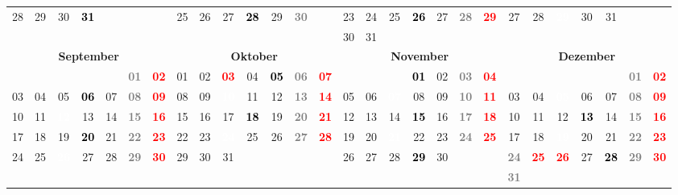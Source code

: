 \documentclass[10pt,a4paper,landscape]{article}
\newcommand{\yb}[1]{\cellcolor{yellow}\textcolor{black}{\bf #1}}
\newcommand{\iv}[1]{\cellcolor{black}\textcolor{white}{\bf #1}}
\newcommand{\rb}[1]{\textbf{\textcolor{red}{#1}}}
\newcommand{\hv}[1]{\textbf{\textcolor{Gray}{#1}}}
\begin{document}
\begin{tabular}{|ccccccc|ccccccc|ccccccc|ccccccc|}
28 & 29 & 30 & \yb{31} & & & & 25 & 26 & 27 & \yb{28} & 29 & \hv{30} & & 23 & 24 & 25 & \yb{26} & 27 & \hv{28} & \rb{29} & 27 & 28 & \iv{29} & 30 & 31 & &  \\
& & & & & & & & & & & & & & 30 & 31 & & & & & & & & & & & &  \\
\hline
\multicolumn{7}{|c|}{\bf September} & \multicolumn{7}{|c|}{\bf Oktober} & \multicolumn{7}{|c|}{\bf November} & \multicolumn{7}{|c|}{\bf Dezember} \\
& & & & & \hv{01} & \rb{02} & 01 & 02 & \rb{03} & 04 & \yb{05} & \hv{06} & \rb{07} & & & & \yb{01} & 02 & \hv{03} & \rb{04} & & & & & & \hv{01} & \rb{02} \\
03 & 04 & 05 & \yb{06} & 07 & \hv{08} & \rb{09} & 08 & 09 & \iv{10} & 11 & 12 & \hv{13} & \rb{14} & 05 & 06 & \iv{07} & 08 & 09 & \hv{10} & \rb{11} & 03 & 04 & \iv{05} & 06 & 07 & \hv{08} & \rb{09} \\
10 & 11 & \iv{12} & 13 & 14 & \hv{15} & \rb{16} & 15 & 16 & 17 & \yb{18} & 19 & \hv{20} & \rb{21} & 12 & 13 & 14 & \yb{15} & 16 & \hv{17} & \rb{18} & 10 & 11 & 12 & \yb{13} & 14 & \hv{15} & \rb{16} \\
17 & 18 & 19 & \yb{20} & 21 & \hv{22} & \rb{23} & 22 & 23 & \iv{24} & 25 & 26 & \hv{27} & \rb{28} & 19 & 20 & \iv{21} & 22 & 23 & \hv{24} & \rb{25} & 17 & 18 & \iv{19} & 20 & 21 & \hv{22} & \rb{23} \\
24 & 25 & \iv{26} & 27 & 28 & \hv{29} & \rb{30} & 29 & 30 & 31 & & & & & 26 & 27 & 28 & \yb{29} & 30 & & & \hv{24} & \rb{25} & \rb{26} & 27 & \yb{28} & \hv{29} & \rb{30} \\
& & & & & & & & & & & & & & & & & & & & & \hv{31} & & & & & &  \\
\hline
\end{tabular}
\end{document}
